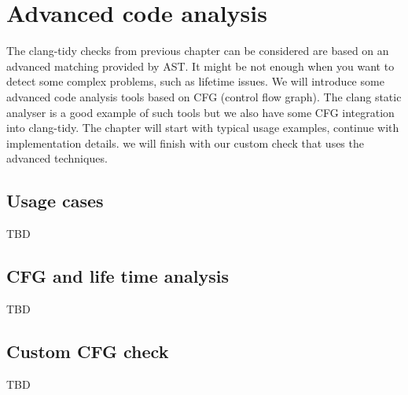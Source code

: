 \chapter{Advanced code analysis}
The clang-tidy checks from previous chapter can be considered are based on an
advanced matching provided by AST. It might be not enough when you want to
detect some complex problems, such as lifetime issues. We will introduce some
advanced code analysis tools based on CFG (control flow graph). The clang static
analyser is a good example of such tools but we also have some CFG integration
into clang-tidy. The chapter will start with typical usage examples, continue
with implementation details. we will finish with our custom check that uses the
advanced techniques.

\section{Usage cases}
TBD

\section{CFG and life time analysis}
TBD

\section{Custom CFG check}
TBD

